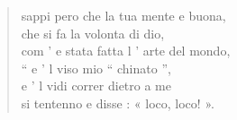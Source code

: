 \documentclass[10pt,twocolumn,letterpaper]{article}
\begin{document}

\begin{quote}
%
%
sappi pero che la tua mente e buona,\\
che si fa la volonta di dio,\\
com ’ e stata fatta l ’ arte del mondo,\\

“ e ’ l viso mio “ chinato ”,\\
e ’ l vidi correr dietro a me\\
si tentenno e disse : « loco, loco! ».\\
%
\end{quote}

%
%
%
%
\end{document}
